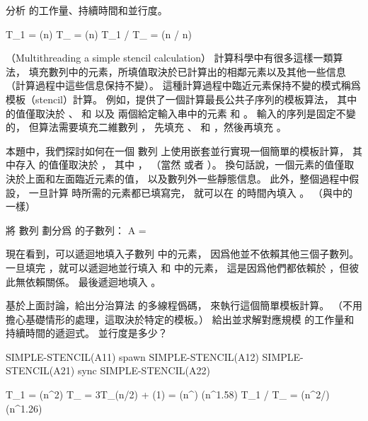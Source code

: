 \startigBase[continue]\startitem
分析  的工作量、持續時間和並行度。
\stopitem\stopigBase

\startANSWER
\startformula\startmathalignment
\NC T_1 \NC = \Theta(n) \NR
\NC T_{\infty} \NC = \Theta(\lg n) \NR
\NC T_1 / T_{\infty} \NC = \Theta(n / \lg n) \NR
\stopmathalignment\stopformula
\stopANSWER

\stopPROBLEM

\startPROBLEM
（Multithreading a simple stencil calculation）
計算科學中有很多這樣一類算法，
填充數列中的元素，所填值取決於已計算出的相鄰元素以及其他一些信息
（計算過程中這些信息保持不變）。
這種計算過程中臨近元素保持不變的模式稱爲{\EMP 模板（stencil）}計算。
例如，\insection[lcs] 提供了一個計算最長公共子序列的模板算法，
其中  的值僅取決於 、  和  以及
兩個給定輸入串中的元素  和 。
輸入的序列是固定不變的，
但算法需要填充二維數列 ，
先填充 、  和 ，然後再填充 。

本題中，我們探討如何在一個  數列  上使用嵌套並行實現一個簡單的模板計算，
其中存入  的值僅取決於 ，
其中 ，  （當然  或者 ）。
換句話說，一個元素的值僅取決於上面和左面臨近元素的值，
以及數列外一些靜態信息。
此外，整個過程中假設，
一旦計算  時所需的元素都已填寫完，
就可以在  的時間內填入 。
（與\insection[lcs] 中的  一樣）

將  數列  劃分爲  的子數列：
\startformula
A = 
\stopformula

現在看到，可以遞迴地填入子數列  中的元素，
因爲他並不依賴其他三個子數列。
一旦填完 ，就可以遞迴地並行填入  和  中的元素，
這是因爲他們都依賴於 ，但彼此無依賴關係。
最後遞迴地填入 。

\startigBase[a]\startitem
基於上面討論，給出分治算法  的多線程僞碼，
來執行這個簡單模板計算。
（不用擔心基礎情形的處理，這取決於特定的模板。）
給出並求解對應規模  的工作量和持續時間的遞迴式。
並行度是多少？
\stopitem\stopigBase

\startANSWER
{}
\startCLRS
SIMPLE-STENCIL(A11)
spawn SIMPLE-STENCIL(A12)
SIMPLE-STENCIL(A21)
sync
SIMPLE-STENCIL(A22)
\stopCLRS

\startformula\startmathalignment
\NC T_1 \NC = \Theta(n^2) \NR
\NC T_{\infty} \NC = 3T_{\infty}(n/2) + \Theta(1) = \Theta(n^{}) \approx \Theta(n^{1.58}) \NR
\NC T_1 / T_{\infty} \NC = \Theta(n^{2/}) \approx \Theta(n^{1.26}) \NR
\stopmathalignment\stopformula
\stopANSWER

